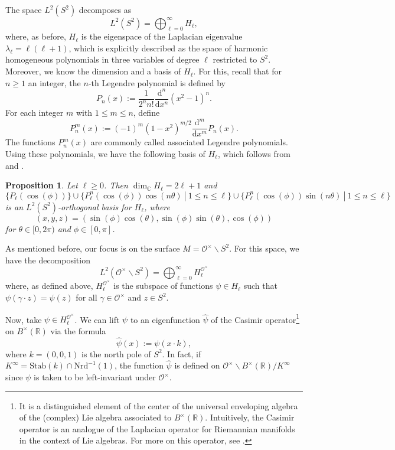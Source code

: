 \documentclass[11pt]{amsart}
\newcommand{\bigo}{\mathcal{O}}
\newcommand{\R}{\mathbb{R}}
\newcommand{\C}{\mathbb{C}}
\newtheorem{proposition}[theorem]{Proposition}
\theoremstyle{definition}
\theoremstyle{remark}
\begin{document}
The space $L^2(S^2)$ decomposes as $$ L^2(S^2) = \bigoplus_{\ell=0}^{\infty} H_\ell,$$ where, as before, $H_\ell$ is the eigenspace of the Laplacian eigenvalue $\lambda_{\ell} = \ell(\ell+1)$, which is explicitly described as the space of harmonic homogeneous polynomials in three variables of degree $\ell$ restricted to $S^2$. Moreover, we know the dimension and a basis of $H_\ell$. For this, recall that for $n\geq 1$ an integer, the $n$-th Legendre polynomial is defined by $$P_n(x) := \frac{1}{2^n n!} \frac{\mathrm{d}^n}{\mathrm{d}x^n}(x^2-1)^n.$$ For each integer $m$ with $1\leq m\leq n$, define $$ P_{n}^{m}(x) := (-1)^m (1-x^2)^{m/2} \frac{\mathrm{d}^m}{\mathrm{d}x^m} P_n(x).$$ The functions $P_{n}^{m}(x)$ are commonly called associated Legendre polynomials. Using these polynomials, we have the following basis of $H_\ell$, which follows from \cite[\S 54--56]{Hobson} and \cite[\S VII.9]{MacRobert}.

\begin{proposition}\label{dimBasisHk}
Let $\ell\geq 0$. Then $\dim_{\C} {H_\ell} = 2\ell+1$ and $$ \{P_\ell(\cos(\phi))\} \cup \{P_{\ell}^{n}(\cos(\phi))\cos(n\theta) \: |\: 1\leq n\leq \ell\} \cup \{P_{\ell}^{n}(\cos(\phi))\sin(n\theta) \: |\: 1\leq n\leq \ell\}$$ is an $L^2(S^2)$-orthogonal basis for $H_\ell$, where $$(x,y,z)=(\sin(\phi) \cos(\theta), \sin(\phi) \sin(\theta), \cos(\phi))$$ for $\theta \in [0,2\pi)$ and $\phi \in [0,\pi]$.
\end{proposition}

As mentioned before, our focus is on the surface $M=\bigo^{\times} \backslash S^2$. For this space, we have the decomposition $$ L^2(\bigo^{\times} \backslash S^2) = \bigoplus_{\ell=0}^{\infty} H_{\ell}^{\bigo^{\times}}$$ where, as defined above, $H_{\ell}^{\bigo^{\times}}$ is the subspace of functions $\psi\in H_{\ell}$ such that $\psi(\gamma \cdot z) = \psi(z)$ for all $\gamma \in \bigo^{\times}$ and $z \in S^2$.

Now, take $\psi \in H_{\ell}^{\bigo^{\times}}$. We can lift $\psi$ to an eigenfunction $\widehat{\psi}$ of the Casimir operator\footnote{It is a distinguished element of the center of the universal enveloping algebra of the (complex) Lie algebra associated to $B^{\times}(\R)$. Intuitively, the Casimir operator is an analogue of the Laplacian operator for Riemannian manifolds in the context of Lie algebras. For more on this operator, see \cite[\S 10.2]{HallLieStuff}.} on $B^{\times}(\R)$ via the formula $$ \widehat{\psi}(x) := \psi(x\cdot k),$$ where $k=(0,0,1)$ is the north pole of $S^2$. In fact, if $K^{\infty} = \mathrm{Stab}(k) \cap \mathrm{Nrd}^{-1}(1)$, the function $\widehat{\psi}$ is defined on $\bigo^{\times} \backslash B^{\times}(\R)/K^{\infty}$ since $\psi$ is taken to be left-invariant under $\bigo^{\times}$.
\end{document}
